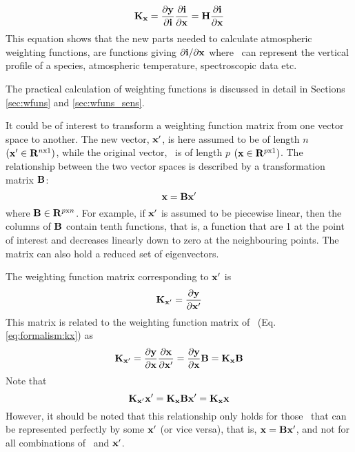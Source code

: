  \begin{equation}
   \mathbf{K_x} = \frac{\partial \mathbf{y}}{\partial \mathbf{i}}\frac{\partial\mathbf{i}}{\partial \mathbf{x}} =
    \mathbf{H}\frac{\partial\mathbf{i}}{\partial \mathbf{x}}
  \label{eq:formalism:kx2}
 \end{equation}
 This equation shows that the new parts needed to calculate
 atmospheric weighting functions, are functions giving $\partial\mathbf{i} /
 \partial \mathbf{x}$ where \xt\ can represent the vertical profile of a
 species, atmospheric temperature, spectroscopic data etc.
 
 The practical calculation of weighting functions is discussed in
 detail in Sections \ref{sec:wfuns} and \ref{sec:wfuns_sens}.


 
  It could be of interest to transform a weighting function matrix from
  one vector space to another. The new vector, $\mathbf{x}'$, is here
  assumed to be of length $n$ $(\mathbf{x}' \in {\bf R}^{n {\mathrm x} 1})$, while the original
  vector, \xt\ is of length $p$ $(\mathbf{x} \in {\bf R}^{p {\mathrm x} 1})$.  The
  relationship between the two vector spaces is described by a
  transformation matrix $\mathbf{B}$:
  \begin{equation}
    \mathbf{x} = \mathbf{B}\mathbf{x}'
  \end{equation}
  where $\mathbf{B} \in {\bf R}^{p {\mathrm x} n}$. For example, if $\mathbf{x}'$ is assumed to be
  piecewise linear, then the columns of $\mathbf{B}$ contain tenth functions,
  that is, a function that are 1 at the point of interest and decreases
  linearly down to zero at the neighbouring points.  The matrix can
  also hold a reduced set of eigenvectors.
    
  The weighting function matrix corresponding to $\mathbf{x}'$ is
  \begin{equation}
    \mathbf{K}_{\mathbf{x}'} = \frac{\partial \mathbf{y}}{\partial \mathbf{x}'}
  \end{equation}
  This matrix is related to the weighting function matrix of \xt\ (Eq.
  \ref{eq:formalism:kx}) as
  \begin{equation}
    \mathbf{K}_{\mathbf{x}'}
      = \frac{\partial \mathbf{y}}{\partial \mathbf{x}} \frac{\partial \mathbf{x}}{\partial \mathbf{x}'}
      = \frac{\partial \mathbf{y}}{\partial \mathbf{x}} \mathbf{B} 
      = \mathbf{K_x} \mathbf{B}
  \end{equation}
  Note that
  \begin{equation}
    \mathbf{K}_{\mathbf{x}'}\mathbf{x}' = \mathbf{K_x}\mathbf{B}\mathbf{x}' =  \mathbf{K_x}\mathbf{x}
  \end{equation}
  However, it should be noted that this relationship only holds for
  those \xt\ that can be represented perfectly by some $\mathbf{x}'$ (or vice
  versa), that is, $\mathbf{x}=\mathbf{B}\mathbf{x}'$, and not for all combinations of \xt\ 
  and $\mathbf{x}'$.

